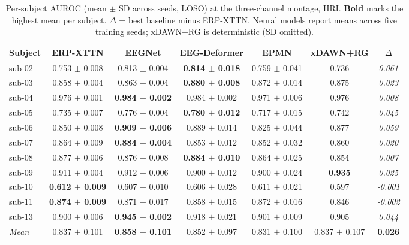 
\begin{table}[t]
\centering
\caption{Per-subject AUROC (mean $\pm$ SD across seeds, LOSO) at the three-channel montage, HRI. \textbf{Bold} marks the highest mean per subject. $\Delta$ = best baseline minus ERP-XTTN. Neural models report means across five training seeds; xDAWN+RG is deterministic (SD omitted).}
\label{sup:tab-persubj-hri}
\begin{tabular}{lcccccc}
\toprule
Subject & ERP-XTTN & EEGNet & EEG-Deformer & EPMN & xDAWN+RG & $\Delta$ \\
\midrule
sub-02 & 0.753 $\pm$ 0.008 & 0.813 $\pm$ 0.004 & \textbf{0.814 $\pm$ 0.018} & 0.759 $\pm$ 0.041 & 0.736 & \textit{0.061} \\
sub-03 & 0.858 $\pm$ 0.004 & 0.863 $\pm$ 0.004 & \textbf{0.880 $\pm$ 0.008} & 0.872 $\pm$ 0.014 & 0.875 & \textit{0.023} \\
sub-04 & 0.976 $\pm$ 0.001 & \textbf{0.984 $\pm$ 0.002} & 0.984 $\pm$ 0.002 & 0.971 $\pm$ 0.006 & 0.976 & \textit{0.008} \\
sub-05 & 0.735 $\pm$ 0.007 & 0.776 $\pm$ 0.004 & \textbf{0.780 $\pm$ 0.012} & 0.717 $\pm$ 0.015 & 0.742 & \textit{0.045} \\
sub-06 & 0.850 $\pm$ 0.008 & \textbf{0.909 $\pm$ 0.006} & 0.889 $\pm$ 0.014 & 0.825 $\pm$ 0.044 & 0.877 & \textit{0.059} \\
sub-07 & 0.864 $\pm$ 0.009 & \textbf{0.884 $\pm$ 0.004} & 0.853 $\pm$ 0.012 & 0.852 $\pm$ 0.032 & 0.860 & \textit{0.020} \\
sub-08 & 0.877 $\pm$ 0.006 & 0.876 $\pm$ 0.008 & \textbf{0.884 $\pm$ 0.010} & 0.864 $\pm$ 0.025 & 0.854 & \textit{0.007} \\
sub-09 & 0.911 $\pm$ 0.004 & 0.912 $\pm$ 0.006 & 0.900 $\pm$ 0.012 & 0.900 $\pm$ 0.024 & \textbf{0.935} & \textit{0.025} \\
sub-10 & \textbf{0.612 $\pm$ 0.009} & 0.607 $\pm$ 0.010 & 0.606 $\pm$ 0.028 & 0.611 $\pm$ 0.021 & 0.597 & \textit{-0.001} \\
sub-11 & \textbf{0.874 $\pm$ 0.009} & 0.871 $\pm$ 0.017 & 0.858 $\pm$ 0.015 & 0.872 $\pm$ 0.016 & 0.846 & \textit{-0.002} \\
sub-13 & 0.900 $\pm$ 0.006 & \textbf{0.945 $\pm$ 0.002} & 0.918 $\pm$ 0.021 & 0.901 $\pm$ 0.009 & 0.905 & \textit{0.044} \\
\midrule
\textit{Mean} & 0.837 $\pm$ 0.101 & \textbf{0.858 $\pm$ 0.101} & 0.852 $\pm$ 0.097 & 0.831 $\pm$ 0.100 & 0.837 $\pm$ 0.107 & \textbf{0.026} \\
\bottomrule
\end{tabular}
\end{table}

